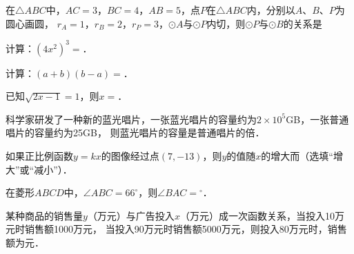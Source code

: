 \documentclass{article}
\begin{document}
\begin{question}[6]
    \item 在$\triangle ABC$中，$AC=3$，$BC=4$，$AB=5$，点$P$在$\triangle ABC$内，分别以$A$、$B$、$P$为圆心画圆，
          $r_A=1$，$r_B=2$，$r_P=3$，$\odot A$与$\odot P$内切，则$\odot P$与$\odot B$的关系是
\end{question}


\begin{question}[7]
    \item 计算：$(4x^2)^3=$\blank ．
\end{question}

\begin{question}[8]
    \item 计算：$(a+b)(b-a)=$\blank ．
\end{question}

\begin{question}[9]
    \item 已知$\sqrt{2x-1}=1$，则$x=$\blank ．
\end{question}

\newpage

\rfoot{}
\cfoot{}

\begin{question}[10]
    \item 科学家研发了一种新的蓝光唱片，一张蓝光唱片的容量约为$2\times 10^5$GB，一张普通唱片的容量约为25GB，
          则蓝光唱片的容量是普通唱片的\blank 倍．
\end{question}

\begin{question}[11]
    \item 如果正比例函数$y=kx$的图像经过点$(7,-13)$，则$y$的值随$x$的增大而\blank （选填“增大”或“减小”）．
\end{question}

\begin{question}[12]
    \item 在菱形$ABCD$中，$\angle ABC=66^\circ$，则$\angle BAC=$\blank $^\circ$．
\end{question}

\begin{question}[13]
    \item 某种商品的销售量$y$（万元）与广告投入$x$（万元）成一次函数关系，当投入10万元时销售额1000万元，
          当投入90万元时销售额5000万元，则投入80万元时，销售额为\blank 元．
\end{question}
\end{document}
